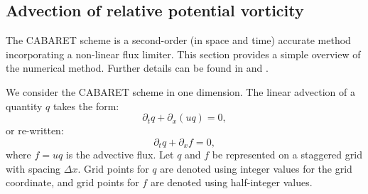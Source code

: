 \documentclass[a4paper]{book}
\begin{document}
\subsection{Advection of relative potential vorticity}

The CABARET scheme is a second-order (in space and time) accurate method
incorporating a non-linear flux limiter. This section provides a simple
overview of the numerical method. Further details can be found in
\citet{karabasov2007} and \citet{karabasov2009}.

We consider the CABARET scheme in one dimension. The linear advection of a
quantity $q$ takes the form:
\begin{equation}
  \partial_t q + \partial_x \left( u q \right) = 0,
\end{equation}
or re-written:
\begin{equation}
  \partial_t q + \partial_x f = 0,
\end{equation}
where $f = u q$ is the advective flux. Let $q$ and $f$ be represented on a
staggered grid with spacing $\Delta x$.
Grid points for $q$ are denoted using integer values for the grid coordinate,
and grid points for $f$ are denoted using half-integer values.
\end{document}
